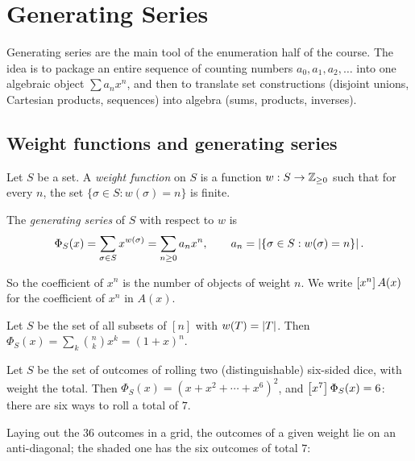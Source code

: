 \chapter{Generating Series}

Generating series are the main tool of the enumeration half of the course. The idea is to
package an entire sequence of counting numbers $a_0, a_1, a_2, \dots$ into one algebraic
object $\sum a_n x^n$, and then to translate set constructions (disjoint unions, Cartesian
products, sequences) into algebra (sums, products, inverses).

\section{Weight functions and generating series}

\begin{definition}
Let $S$ be a set. A \emph{weight function} on $S$ is a function $w : S \to \mathbb{Z}_{\ge 0}$ such
that for every $n$, the set $\{\sigma \in S : w(\sigma) = n\}$ is finite.
\end{definition}

\begin{definition}
The \emph{generating series} of $S$ with respect to $w$ is
\[
\Phi_S(x) = \sum_{\sigma \in S} x^{w(\sigma)} = \sum_{n \ge 0} a_n x^n,
\qquad a_n = \left\lvert \{\sigma \in S : w(\sigma) = n\} \right\rvert.
\]
\end{definition}

So the coefficient of $x^n$ is the number of objects of weight $n$. We write $\left[x^{n}\right]A(x)$
for the coefficient of $x^n$ in $A(x)$.

\begin{example}
Let $S$ be the set of all subsets of $[n]$ with $w(T) = \left\lvert T \right\rvert$. Then
$\Phi_S(x) = \sum_{k} \binom{n}{k} x^k = (1+x)^n$.
\end{example}

\begin{example}
Let $S$ be the set of outcomes of rolling two (distinguishable) six-sided dice, with weight the
total. Then $\Phi_S(x) = (x + x^2 + \cdots + x^6)^2$, and
$\left[x^{7}\right]\Phi_S(x) = 6$: there are six ways to roll a total of $7$.
\end{example}

Laying out the $36$ outcomes in a grid, the outcomes of a given weight lie on an anti-diagonal;
the shaded one has the six outcomes of total $7$:
\begin{center}
\end{center}

